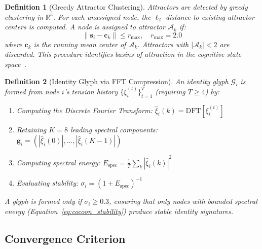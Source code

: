 \documentclass[11pt,a4paper]{article}
\newtheorem{definition}{Definition}[section]
\begin{document}
\begin{definition}[Greedy Attractor Clustering]
Attractors are detected by greedy clustering in $\mathbb{R}^5$. For each unassigned node, the $\ell_2$ distance to existing attractor centers is computed. A node is assigned to attractor $\mathcal{A}_k$ if:
\begin{equation}
  \|\mathbf{s}_i - \mathbf{c}_k\| \leq r_{\max}, \quad r_{\max} = 2.0
  \label{eq:attractor_radius}
\end{equation}
where $\mathbf{c}_k$ is the running mean center of $\mathcal{A}_k$. Attractors with $|\mathcal{A}_k| < 2$ are discarded. This procedure identifies basins of attraction in the cognitive state space~\citep{strogatz2015nonlinear}.
\end{definition}

\begin{definition}[Identity Glyph via FFT Compression]
An identity glyph $\mathcal{G}_i$ is formed from node $i$'s tension history $\{\xi_i^{(t)}\}_{t=1}^{T}$ (requiring $T \geq 4$) by:
\begin{enumerate}
  \item Computing the Discrete Fourier Transform: $\hat{\xi}_i(k) = \text{DFT}[\xi_i^{(t)}]$
  \item Retaining $K = 8$ leading spectral components: $\mathbf{g}_i = (|\hat{\xi}_i(0)|, \ldots, |\hat{\xi}_i(K-1)|)$
  \item Computing spectral energy: $E_{\text{spec}} = \frac{1}{T}\sum_k |\hat{\xi}_i(k)|^2$
  \item Evaluating stability: $\sigma_i = (1 + E_{\text{spec}})^{-1}$
\end{enumerate}
A glyph is formed only if $\sigma_i \geq 0.3$, ensuring that only nodes with bounded spectral energy (Equation~\ref{eq:cocoon_stability}) produce stable identity signatures.
\end{definition}

\subsection{Convergence Criterion}
\end{document}
